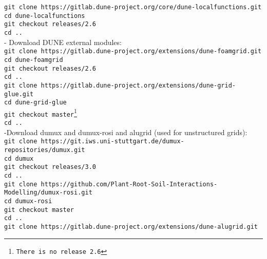 \texttt{git clone https://gitlab.dune-project.org/core/dune-localfunctions.git}\\
    \hspace{\parindent} \texttt{cd dune-localfunctions}\\
    \hspace{\parindent} \texttt{git checkout releases/2.6}\\
		\hspace{\parindent} \texttt{cd ..}\\
- Download DUNE external modules:\\
\texttt{git clone https://gitlab.dune-project.org/extensions/dune-foamgrid.git}\\
    \hspace{\parindent} \texttt{cd dune-foamgrid}\\
    \hspace{\parindent} \texttt{git checkout releases/2.6}\\
		\hspace{\parindent} \texttt{cd ..}\\
\texttt{git clone https://gitlab.dune-project.org/extensions/dune-grid-glue.git}\\
    \hspace{\parindent} \texttt{cd dune-grid-glue}\\
    \hspace{\parindent} \texttt{git checkout master\footnote{There is no release 2.6}}\\
		\hspace{\parindent} \texttt{cd ..}\\

-Download dumux and dumux-rosi and alugrid (used for unstructured grids):\\
\texttt{git clone https://git.iws.uni-stuttgart.de/dumux-repositories/dumux.git}\\
    \hspace{\parindent} \texttt{cd dumux}\\
    \hspace{\parindent} \texttt{git checkout releases/3.0}\\
		\hspace{\parindent} \texttt{cd ..}\\
\texttt{git clone https://github.com/Plant-Root-Soil-Interactions-Modelling/dumux-rosi.git}\\
    \hspace{\parindent} \texttt{cd dumux-rosi}\\
    \hspace{\parindent} \texttt{git checkout master}\\
		\hspace{\parindent} \texttt{cd ..}\\
\texttt{git clone https://gitlab.dune-project.org/extensions/dune-alugrid.git}\\

